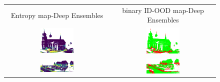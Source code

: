     \begin{figure}[h!]
        \centering
        \begin{tabular}{cc}
            Entropy map-Deep Ensembles & binary ID-OOD map-Deep Ensembles \\
            \includegraphics[width=0.33\textwidth, height=0.18\textheight]{images/ood_imgs/de_sem3d/de_ent_10_1.pdf}& 
            \includegraphics[width=0.33\textwidth, height=0.18\textheight]{images/ood_imgs/de_sem3d/de_ent_ood_auroc_1.pdf}\\

            \includegraphics[width=0.33\textwidth, height=0.18\textheight]{images/ood_imgs/de_sem3d/de_ent_10_2.pdf}& 
            \includegraphics[width=0.33\textwidth, height=0.18\textheight]{images/ood_imgs/de_sem3d/de_ent_ood_auroc_2.pdf}\\


\end{tabular}
\end{figure}
